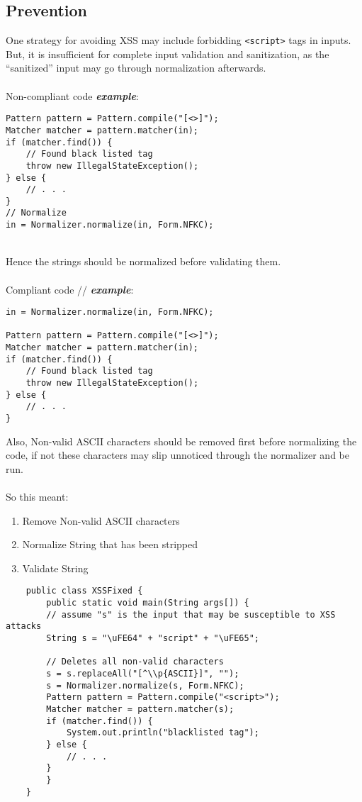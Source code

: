 \documentclass[a4paper]{article}
\begin{document}
\subsection{Prevention}
One strategy for avoiding XSS may include forbidding \texttt{<script>} tags in inputs. But, it is insufficient for complete input validation and sanitization, as the “sanitized” input may go through normalization afterwards.\\
\\
Non-compliant code \textbf{\textit{example}}:
\begin{verbatim}
Pattern pattern = Pattern.compile("[<>]"); 
Matcher matcher = pattern.matcher(in);
if (matcher.find()) {
	// Found black listed tag
	throw new IllegalStateException();
} else {
	// . . .
}
// Normalize
in = Normalizer.normalize(in, Form.NFKC);
\end{verbatim}
\mbox{}\\
Hence the strings should be normalized before validating them.\\
\\
Compliant code // \textbf{\textit{example}}:
\begin{verbatim}
in = Normalizer.normalize(in, Form.NFKC);

Pattern pattern = Pattern.compile("[<>]"); 
Matcher matcher = pattern.matcher(in);
if (matcher.find()) {
	// Found black listed tag
	throw new IllegalStateException();
} else {
	// . . .
}
\end{verbatim}
Also, Non-valid ASCII characters should be removed first before normalizing the code, if not these characters may slip unnoticed through the normalizer and be run.\\
\\
So this meant:
\begin{enumerate}
	\item Remove Non-valid ASCII characters
	\item Normalize String that has been stripped
	\item Validate String
\end{enumerate}
\newpage
\begin{verbatim}
	public class XSSFixed {
		public static void main(String args[]) {
		// assume "s" is the input that may be susceptible to XSS attacks
		String s = "\uFE64" + "script" + "\uFE65";
		
		// Deletes all non-valid characters
		s = s.replaceAll("[^\\p{ASCII}]", "");
		s = Normalizer.normalize(s, Form.NFKC);
		Pattern pattern = Pattern.compile("<script>");
		Matcher matcher = pattern.matcher(s);
		if (matcher.find()) {
			System.out.println("blacklisted tag");
		} else {
			// . . .
		}
		}
	}
\end{verbatim}
\end{document}
